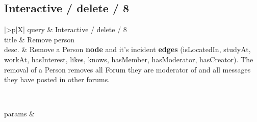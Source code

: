 \renewcommand*{\arraystretch}{1.1}

\subsection{Interactive / delete / 8}
\label{sec:interactive-delete-08}

\let\oldemph\emph
\renewcommand{\emph}[1]{{\footnotesize \sf #1}}

\renewcommand{\currentQueryCard}{8}


\noindent\begin{tabularx}{\queryCardWidth}{|>{\queryPropertyCell}p{\queryPropertyCellWidth}|X|}
	\hline
	query & Interactive / delete / 8 \\ \hline
%
	title & Remove person \\ \hline
%
%
	desc. & Remove a \emph{Person} \textbf{node} and it's incident \textbf{edges} (\emph{isLocatedIn}, \emph{studyAt}, \emph{workAt}, \emph{hasInterest}, \emph{likes}, \emph{knows}, \emph{hasMember}, \emph{hasModerator}, \emph{hasCreator}). The removal of a \emph{Person} removes all \emph{Forum} they are moderator of and all messages they have posted in other forums. 

 \\ \hline
%
	
		params &
		\innerCardVSpace \\ \hline
	
%
	
%
\end{tabularx}
\queryCardVSpace

\let\emph\oldemph

